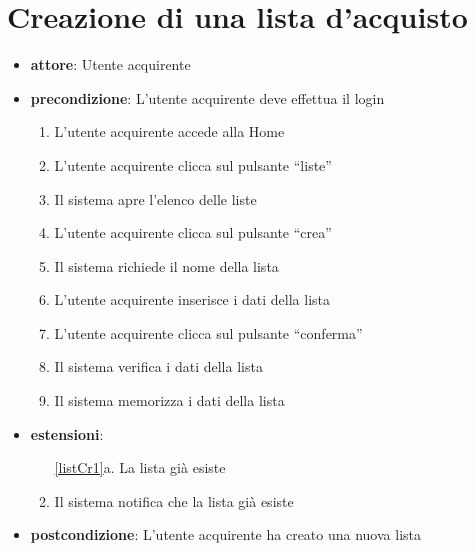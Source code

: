 \section{Creazione di una lista d’acquisto}
\begin{itemize}
    \item \textbf{attore}: Utente acquirente
    \item \textbf{precondizione}: L’utente acquirente deve effettua il login

    \begin{enumerate}
        \item L’utente acquirente accede alla Home
        \item L’utente acquirente clicca sul pulsante “liste”
        \item Il sistema apre l’elenco delle liste
        \item L’utente acquirente clicca sul pulsante “crea”
        \item Il sistema richiede il nome della lista 
        \item L’utente acquirente inserisce i dati della lista
        \item L’utente acquirente clicca sul pulsante “conferma”
        \item Il sistema verifica i dati della lista
        \label{listCr1}
        \item Il sistema memorizza i dati della lista
    \end{enumerate}

    \item \textbf{estensioni}:
    \begin{enumerate}
        \item[\ref{listCr1}a.] La lista già esiste
        \item Il sistema notifica che la lista già esiste
    \end{enumerate}

    \item \textbf{postcondizione}: L’utente acquirente ha creato una nuova lista
\end{itemize}
		

